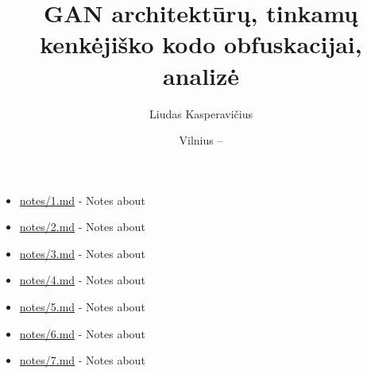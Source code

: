 \documentclass[
    english, %
]{VUMIFPSkursinis}
\title{GAN architektūrų, tinkamų kenkėjiško kodo obfuskacijai, analizė}
\author{Liudas Kasperavičius}
\date{Vilnius – \the\year}
\begin{document}
\maketitle

\tableofcontents


\begin{itemize}
    \item \url{notes/1.md} - Notes about \cite{nguyenGenerativeAdversarialNetworks2023}
    \item \url{notes/2.md} - Notes about \cite{zhongMalFoxCamouflagedAdversarial2024}
    \item \url{notes/3.md} - Notes about \cite{zhongReinforcementLearningBased2022}
    \item \url{notes/4.md} - Notes about \cite{kawaiImprovedMalGANAvoiding2019}
    \item \url{notes/5.md} - Notes about \cite{huGeneratingAdversarialMalware2017}
    \item \url{notes/6.md} - Notes about \cite{fangEvadingMalwareEngines2019}
    \item \url{notes/7.md} - Notes about \cite{zhuNgramMalGANEvading2022}
\end{itemize}





\printbibliography[heading=bibintoc]


\end{document}
